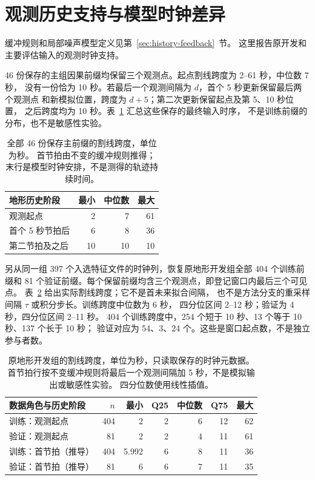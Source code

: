 \section{观测历史支持与模型时钟差异}
\label{sec:empirical-history-timings}\hypertarget{sec:empirical-history-timings}{}
缓冲规则和局部噪声模型定义见第~\ref{sec:history-feedback}~节。
这里报告原开发和主要评估输入的观测时钟支持。

46 份保存的主组因果前缀均保留三个观测点。起点割线跨度为 2--61 秒，中位数 7 秒，
没有一份恰为 10 秒。若最后一个观测间隔为 \(d\)，首个 5 秒更新保留最后两个观测点
和新模拟位置，跨度为 \(d+5\)；第二次更新保留起点及第 5、10 秒位置，
之后跨度均为 10 秒。表~\ref{tab:history-spans} 汇总这些保存的最终输入时序，
不是训练前缀的分布，也不是敏感性实验。

\begin{table}[htbp]
\centering\small
\caption{全部 46 份保存主前缀的割线跨度，单位为秒。
首节拍由不变的缓冲规则推得；末行是模型时钟安排，不是测得的轨迹持续时间。}
\label{tab:history-spans}\hypertarget{tab:history-spans}{}
\begin{tabular}{lrrr}
\toprule
地形历史阶段 & 最小 & 中位数 & 最大\\
\midrule
观测起点 & 2 & 7 & 61\\
首个 5 秒节拍后 & 6 & 8 & 36\\
第二节拍及之后 & 10 & 10 & 10\\
\bottomrule
\end{tabular}
\end{table}

另从同一组 397 个入选特征文件的时钟列，恢复原地形开发组全部 404 个训练前缀和
81 个验证前缀。每个保留前缀均含三个观测点，即登记窗口内最后三个可见点。
表~\ref{tab:development-history-spans} 给出实际割线跨度；它不是首未来拟合间隔，
也不是方法分支的重采样间隔 \(\tau\) 或积分步长。训练跨度中位数为 6 秒，
四分位区间 2--12 秒；验证为 4 秒，四分位区间 2--11 秒。
404 个训练跨度中，254 个短于 10 秒、13 个等于 10 秒、137 个长于 10 秒；
验证对应为 54、3、24 个。这些是窗口起点数，不是独立参与者数。

\begin{table}[htbp]
\centering\small
\caption{原地形开发组的割线跨度，单位为秒，只读取保存的时钟元数据。
首节拍行按不变缓冲规则将最后一个观测间隔加 5 秒，不是模拟输出或敏感性实验。
四分位数使用线性插值。}
\label{tab:development-history-spans}\hypertarget{tab:development-history-spans}{}
\begin{tabular}{lrrrrrr}
\toprule
数据角色与历史阶段 & \(n\) & 最小 & Q25 & 中位数 & Q75 & 最大\\
\midrule
训练：观测起点 & 404 & 2 & 2 & 6 & 12 & 62\\
验证：观测起点 & 81 & 2 & 2 & 4 & 11 & 61\\
训练：首节拍（推导） & 404 & 5.992 & 6 & 8 & 11 & 36\\
验证：首节拍（推导） & 81 & 6 & 6 & 7 & 11 & 35\\
\bottomrule
\end{tabular}
\end{table}

